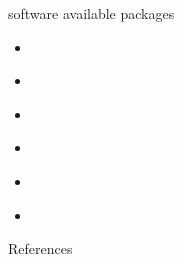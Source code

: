 \documentclass[aspectratio=169]{beamer}
\begin{document}
		\begin{frame}{software}
			available packages
			\begin{itemize}
				\item \href{https://cran.r-project.org/web/packages/rdd/}{\underline{}}
				\item \href{https://rdpackages.github.io/}{\underline{}}
				\item \href{https://rdpackages.github.io/}{\underline{}}
				\item \href{https://rdpackages.github.io/}{\underline{}}
				\item \href{https://rdpackages.github.io/}{\underline{}}
				\item \href{https://rdpackages.github.io/}{\underline{}}
			\end{itemize}
		\end{frame}

	\begin{frame}[t, allowframebreaks]{References}
	  \printbibliography
	\end{frame}
\end{document}
